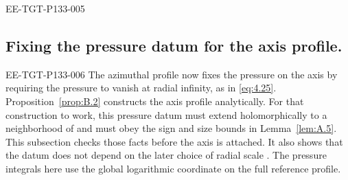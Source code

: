 \begin{EESegment}{EE-TGT-P133-005}
\subsection{Fixing the pressure datum for the axis profile.}\label{sec:A.4}
\end{EESegment}
\begin{EESegment}{EE-TGT-P133-006}
The azimuthal profile  now fixes the pressure
 on the axis by requiring the pressure to vanish at radial infinity, as in
\eqref{eq:4.25}. Proposition~\ref{prop:B.2} constructs the axis profile analytically. For that construction to work,
this pressure datum must extend holomorphically to a neighborhood of  and must obey the
sign and size bounds in Lemma~\ref{lem:A.5}. This subsection checks those facts before the axis is attached. It also
shows that the datum does not depend on the later choice of radial scale . The pressure
integrals here use the global logarithmic coordinate  on the full reference profile.
\end{EESegment}

